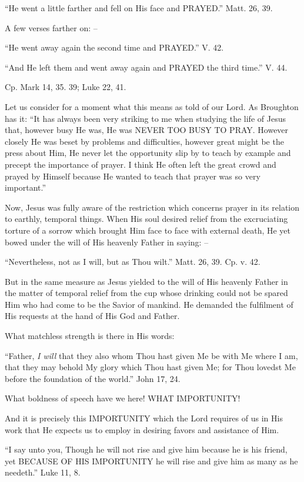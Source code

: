 \documentclass[
]{book}
\begin{document}
``He went a little farther and fell on His face and PRAYED.'' Matt. 26, 39.

A few verses farther on: --

``He went away again the second time and PRAYED.'' V. 42.

``And He left them and went away again and PRAYED the third time.'' V. 44.

Cp. Mark 14, 35. 39; Luke 22, 41.

Let us consider for a moment what this means as told of our Lord. As Broughton has it: ``It has always been very striking to me when studying the life of Jesus that, however busy He was, He was NEVER TOO BUSY TO PRAY. However closely He was beset by problems and difficulties, however great might be the press about Him, He never let the opportunity slip by to teach by example and precept the importance of prayer. I think He often left the great crowd and prayed by Himself because He wanted to teach that prayer was so very important.''

Now, Jesus was fully aware of the restriction which concerns prayer in its relation to earthly, temporal things. When His soul desired relief from the excruciating torture of a sorrow which brought Him face to face with external death, He yet bowed under the will of His heavenly Father in saying: --

``Nevertheless, not as I will, but as Thou wilt.'' Matt. 26, 39. Cp. v. 42.

But in the same measure as Jesus yielded to the will of His heavenly Father in the matter of temporal relief from the cup whose drinking could not be spared Him who had come to be the Savior of mankind. He demanded the fulfilment of His requests at the hand of His God and Father.

What matchless strength is there in His words:

``Father, \emph{I will} that they also whom Thou hast given Me be with Me where I am, that they may behold My glory which Thou hast given Me; for Thou lovedst Me before the foundation of the world.'' John 17, 24.

What boldness of speech have we here! WHAT IMPORTUNITY!

And it is precisely this IMPORTUNITY which the Lord requires of us in His work that He expects us to employ in desiring favors and assistance of Him.

``I say unto you, Though he will not rise and give him because he is his friend, yet BECAUSE OF HIS IMPORTUNITY he will rise and give him as many as he needeth.'' Luke 11, 8.
\end{document}
